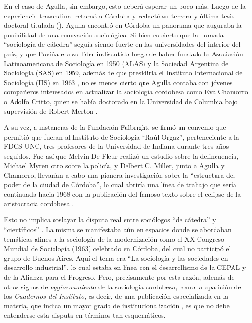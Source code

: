 En el caso de Agulla, sin embargo, esto deberá esperar un poco más. Luego de la experiencia trasandina, retornó a Córdoba y redactó su tercera y última tesis doctoral titulada  (\citeyear{1637-AGULLA1962}). Agulla encontró en Córdoba un panorama que auguraba la posibilidad de una renovación sociológica. Si bien es cierto que la llamada \enquote{sociología de cátedra} seguía siendo fuerte en las universidades del interior del país, y que Poviña era su líder indiscutido luego de haber fundado la Asociación Latinoamericana de Sociología en 1950 (ALAS) y la Sociedad Argentina de Sociología (SAS) en 1959, además de que presidiría el Instituto Internacional de Sociología (IIS) en 1963 \parencite{1615-DIAZ2013}, no es menos cierto que Agulla contaba con jóvenes compañeros interesados en actualizar la sociología cordobesa como Eva Chamorro o Adolfo Critto, quien se había doctorado en la Universidad de Columbia bajo supervisión de Robert Merton \parencite{1676-GRISENDI2014}.

A su vez, a instancias de la Fundación Fulbright, se firmó un convenio que permitió que fueran al Instituto de Sociología \enquote{Raúl Orgaz}, perteneciente a la FDCS-UNC, tres profesores de la Universidad de Indiana durante tres años seguidos. Fue así que Melvin De Fleur realizó un estudio sobre la delincuencia, Michael Myren otro sobre la policía, y Delbert C. Miller, junto a Agulla y Chamorro, llevarían a cabo una pionera investigación sobre la \enquote{estructura del poder de la ciudad de Córdoba}, lo cual abriría una línea de trabajo que sería continuada hacia 1968 con la publicación del famoso texto sobre el eclipse de la aristocracia cordobesa \parencite{1680-GONZALEZ2017}.

Esto no implica soslayar la disputa real entre sociólogos \enquote{de cátedra} y \enquote{científicos} \parencite{1567-BLANCO2004}. La misma se manifestaba aún en espacios donde se abordaban temáticas afines a la sociología de la modernización como el XX Congreso Mundial de Sociología (1963) celebrado en Córdoba, del cual no participó el grupo de Buenos Aires. Aquí el tema era \enquote{La sociología y las sociedades en desarrollo industrial}, lo cual estaba en línea con el desarrollismo de la CEPAL y de la Alianza para el Progreso. Pero, precisamente por esta razón, además de otros signos de \emph{aggiornamiento} de la sociología cordobesa, como la aparición de los \emph{Cuadernos del Instituto}, es decir, de una publicación especializada en la materia, que indica un mayor grado de institucionalización \parencite{1512-SHILS1971}, es que no debe entenderse esta disputa en términos tan esquemáticos.

